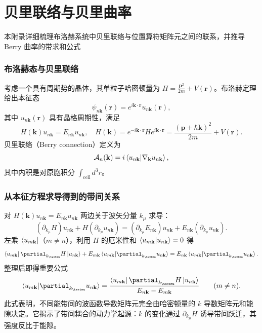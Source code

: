 


\chapter{贝里联络与贝里曲率}
\label{berry}
本附录详细梳理布洛赫系统中贝里联络与位置算符矩阵元之间的联系，并推导 Berry 曲率的带求和公式\cite{xiao_berry_2010}

\subsection{布洛赫态与贝里联络}
考虑一个具有周期势的晶体，其单粒子哈密顿量为 \(H = \frac{\mathbf{p}^2}{2m} + V(\mathbf{r})\)。布洛赫定理给出本征态
\[
\psi_{n\mathbf{k}}(\mathbf{r}) = e^{i\mathbf{k}\cdot\mathbf{r}} u_{n\mathbf{k}}(\mathbf{r}),
\]
其中 \(u_{n\mathbf{k}}(\mathbf{r})\) 具有晶格周期性，满足
\[
H(\mathbf{k}) u_{n\mathbf{k}} = E_{n\mathbf{k}} u_{n\mathbf{k}}, \quad
H(\mathbf{k}) = e^{-i\mathbf{k}\cdot\mathbf{r}} H e^{i\mathbf{k}\cdot\mathbf{r}} = \frac{(\mathbf{p}+\hbar\mathbf{k})^2}{2m} + V(\mathbf{r}).
\]
贝里联络（Berry connection）定义为
\[
\mathcal{A}_n(\mathbf{k}) = i\braket{u_{n\mathbf{k}} | \nabla_{\mathbf{k}} u_{n\mathbf{k}}},
\]
其中内积是对原胞积分 \(\int_{\text{cell}} d^3r\)。

\subsection{从本征方程求导得到的带间关系}
对 \(H(\mathbf{k}) u_{n\mathbf{k}} = E_{n\mathbf{k}} u_{n\mathbf{k}}\) 两边关于波矢分量 \(k_\mu\) 求导：
\[
(\partial_{k_\mu} H) u_{n\mathbf{k}} + H (\partial_{k_\mu} u_{n\mathbf{k}}) = (\partial_{k_\mu} E_{n\mathbf{k}}) u_{n\mathbf{k}} + E_{n\mathbf{k}} (\partial_{k_\mu} u_{n\mathbf{k}}).
\]
左乘 \(\bra{u_{m\mathbf{k}}}\)（\(m \neq n\)），利用 \(H\) 的厄米性和 \(\braket{u_{m\mathbf{k}}|u_{n\mathbf{k}}}=0\) 得
\[
\bra{u_{m\mathbf{k}}} \partial_{k_\mu} H \ket{u_{n\mathbf{k}}} + E_{m\mathbf{k}} \braket{u_{m\mathbf{k}} | \partial_{k_\mu} u_{n\mathbf{k}}} = E_{n\mathbf{k}} \braket{u_{m\mathbf{k}} | \partial_{k_\mu} u_{n\mathbf{k}}}.
\]
整理后即得重要公式
\begin{equation}
\label{eq:non-diag}
\braket{u_{m\mathbf{k}} | \partial_{k_\mu} u_{n\mathbf{k}}} = \frac{ \bra{u_{m\mathbf{k}}} \partial_{k_\mu} H \ket{u_{n\mathbf{k}}} }{ E_{n\mathbf{k}} - E_{m\mathbf{k}} } \qquad (m \neq n). 
\end{equation}
此式表明，不同能带间的波函数导数矩阵元完全由哈密顿量的 \(k\) 导数矩阵元和能隙决定。它揭示了带间耦合的动力学起源：\(k\) 的变化通过 \(\partial_{k_\mu} H\) 诱导带间跃迁，其强度反比于能隙。


